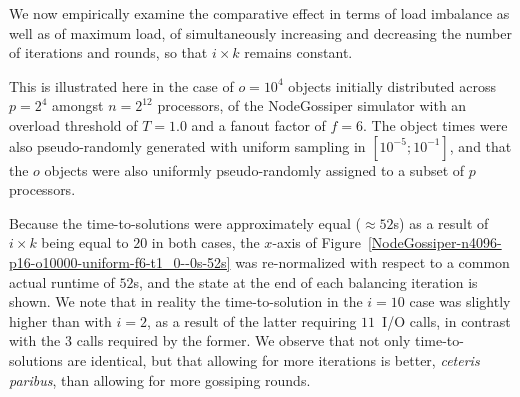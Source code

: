 We now empirically examine the comparative effect in terms of load
imbalance as well as of maximum load, of simultaneously increasing and
decreasing the number of iterations and rounds, so that $i\times{k}$
remains constant.

This is illustrated here in the case of $o=10^4$ objects initially
distributed across $p=2^4$ amongst $n=2^{12}$ processors, of the
\textsf{NodeGossiper} simulator with an overload threshold of $T=1.0$
and a fanout factor of $f=6$.
The object times were also pseudo-randomly generated with uniform
sampling in $[10^{-5};10^{-1}]$, and that the $o$ objects were also
uniformly pseudo-randomly assigned to a subset of $p$ processors.

Because the time-to-solutions were approximately equal ($\approx52$s)
as a result of $i\times{k}$ being equal to $20$ in both cases,
the $x$-axis of
Figure~\ref{NodeGossiper-n4096-p16-o10000-uniform-f6-t1_0--0s-52s}
was re-normalized with respect to a common actual runtime of $52$s,
and the state at the end of each balancing iteration is shown. We note
that in reality the time-to-solution in the $i=10$ case was slightly
higher than with $i=2$, as a result of the latter requiring $11$~I/O
calls, in contrast with the $3$ calls required by the former.
We observe that not only time-to-solutions are identical, but that
allowing for more iterations is better, \emph{ceteris paribus}, than
allowing for more gossiping rounds.
